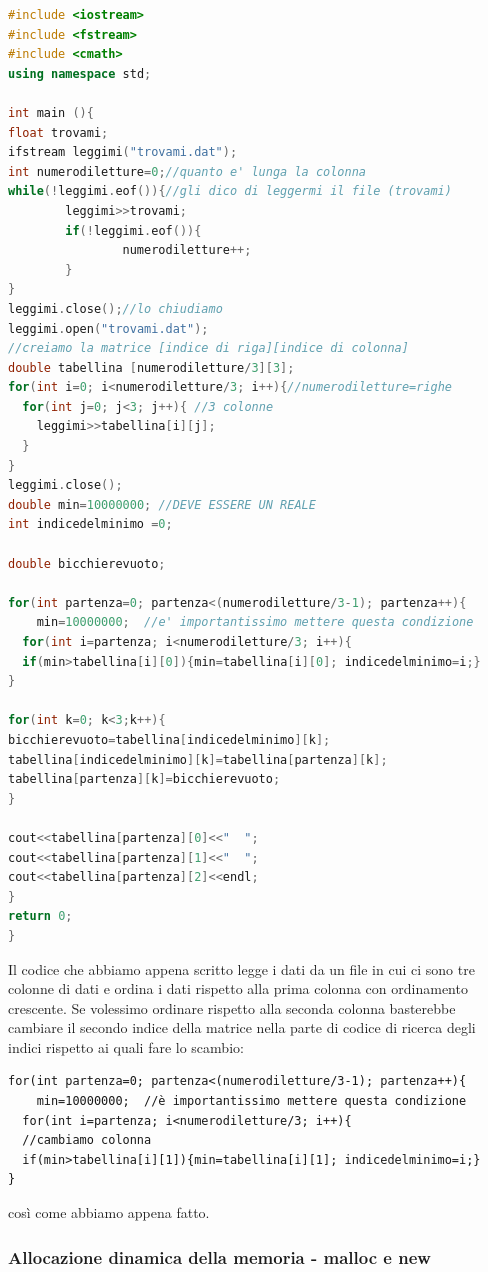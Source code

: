 \documentclass[11pt,fleqn]{book} %
\begin{document}
\begin{lstlisting}[language=c++]
#include <iostream>
#include <fstream>
#include <cmath>
using namespace std;

int main (){
float trovami;
ifstream leggimi("trovami.dat");
int numerodiletture=0;//quanto e' lunga la colonna
while(!leggimi.eof()){//gli dico di leggermi il file (trovami)
        leggimi>>trovami;
        if(!leggimi.eof()){
                numerodiletture++;
        }
}
leggimi.close();//lo chiudiamo
leggimi.open("trovami.dat");
//creiamo la matrice [indice di riga][indice di colonna] 
double tabellina [numerodiletture/3][3];
for(int i=0; i<numerodiletture/3; i++){//numerodiletture=righe
  for(int j=0; j<3; j++){ //3 colonne
    leggimi>>tabellina[i][j];
  }
}
leggimi.close();
double min=10000000; //DEVE ESSERE UN REALE 
int indicedelminimo =0;

double bicchierevuoto;

for(int partenza=0; partenza<(numerodiletture/3-1); partenza++){
    min=10000000;  //e' importantissimo mettere questa condizione
  for(int i=partenza; i<numerodiletture/3; i++){
  if(min>tabellina[i][0]){min=tabellina[i][0]; indicedelminimo=i;}
}

for(int k=0; k<3;k++){
bicchierevuoto=tabellina[indicedelminimo][k];
tabellina[indicedelminimo][k]=tabellina[partenza][k];
tabellina[partenza][k]=bicchierevuoto;
}

cout<<tabellina[partenza][0]<<"  ";
cout<<tabellina[partenza][1]<<"  ";
cout<<tabellina[partenza][2]<<endl;
}
return 0;
}
\end{lstlisting}

Il codice che abbiamo appena scritto legge i dati da un file in cui ci sono tre colonne di dati e ordina i dati rispetto alla prima colonna con ordinamento crescente. Se volessimo ordinare rispetto alla seconda colonna basterebbe cambiare il secondo indice della matrice nella parte di codice di ricerca degli indici rispetto ai quali fare lo scambio:
\begin{verbatim}
for(int partenza=0; partenza<(numerodiletture/3-1); partenza++){
    min=10000000;  //è importantissimo mettere questa condizione
  for(int i=partenza; i<numerodiletture/3; i++){
  //cambiamo colonna
  if(min>tabellina[i][1]){min=tabellina[i][1]; indicedelminimo=i;}
}
\end{verbatim}
così come abbiamo appena fatto.

\subsubsection{Allocazione dinamica della memoria - malloc e new}
\end{document}

